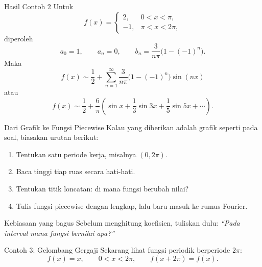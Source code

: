 \documentclass[aspectratio=169,10pt]{beamer}
\begin{document}
\begin{frame}{Hasil Contoh 2}
Untuk
\[
f(x)=
\begin{cases}
2, & 0<x<\pi,\\
-1, & \pi<x<2\pi,
\end{cases}
\]
diperoleh
\[
a_0=1,
\qquad a_n=0,
\qquad b_n=\frac{3}{n\pi}\bigl(1-(-1)^n\bigr).
\]
Maka
\[
f(x)\sim \frac{1}{2}+\sum_{n=1}^{\infty}\frac{3}{n\pi}\bigl(1-(-1)^n\bigr)\sin(nx)
\]
atau
\[
f(x)\sim \frac{1}{2}+\frac{6}{\pi}\left(\sin x+\frac{1}{3}\sin 3x+\frac{1}{5}\sin 5x+\cdots\right).
\]
\end{frame}

\begin{frame}{Dari Grafik ke Fungsi Piecewise}
Kalau yang diberikan adalah grafik seperti pada soal, biasakan urutan berikut:
\begin{enumerate}
  \item Tentukan satu periode kerja, misalnya \((0,2\pi)\).
  \item Baca tinggi tiap ruas secara hati-hati.
  \item Tentukan titik loncatan: di mana fungsi berubah nilai?
  \item Tulis fungsi piecewise dengan lengkap, lalu baru masuk ke rumus Fourier.
\end{enumerate}
\begin{exampleblock}{Kebiasaan yang bagus}
Sebelum menghitung koefisien, tuliskan dulu: \textit{``Pada interval mana fungsi bernilai apa?''}
\end{exampleblock}
\end{frame}

\begin{frame}{Contoh 3: Gelombang Gergaji}
Sekarang lihat fungsi periodik berperiode $2\pi$:
\[
f(x)=x,
\qquad 0<x<2\pi,
\qquad f(x+2\pi)=f(x).
\]
\begin{center}
\end{center}
\end{frame}
\end{document}
